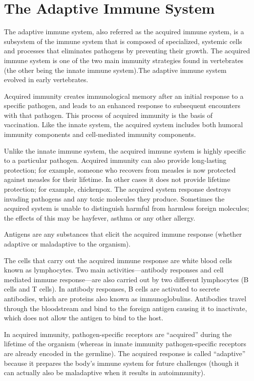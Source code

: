 \hypertarget{the-adaptive-immune-system}{%
\section{The Adaptive Immune System}\label{the-adaptive-immune-system}}

The adaptive immune system, also referred as the acquired immune system, is a subsystem of the immune system that is composed of specialized, systemic cells and processes that eliminates pathogens by preventing their growth. The acquired immune system is one of the two main immunity strategies found in vertebrates (the other being the innate immune system).The adaptive immune system evolved in early vertebrates.

Acquired immunity creates immunological memory after an initial response to a specific pathogen, and leads to an enhanced response to subsequent encounters with that pathogen. This process of acquired immunity is the basis of vaccination. Like the innate system, the acquired system includes both humoral immunity components and cell-mediated immunity components.

Unlike the innate immune system, the acquired immune system is highly specific to a particular pathogen. Acquired immunity can also provide long-lasting protection; for example, someone who recovers from measles is now protected against measles for their lifetime. In other cases it does not provide lifetime protection; for example, chickenpox. The acquired system response destroys invading pathogens and any toxic molecules they produce. Sometimes the acquired system is unable to distinguish harmful from harmless foreign molecules; the effects of this may be hayfever, asthma or any other allergy.

Antigens are any substances that elicit the acquired immune response (whether adaptive or maladaptive to the organism).

The cells that carry out the acquired immune response are white blood cells known as lymphocytes. Two main activities---antibody responses and cell mediated immune response---are also carried out by two different lymphocytes (B cells and T cells). In antibody responses, B cells are activated to secrete antibodies, which are proteins also known as immunoglobulins. Antibodies travel through the bloodstream and bind to the foreign antigen causing it to inactivate, which does not allow the antigen to bind to the host.

In acquired immunity, pathogen-specific receptors are ``acquired'' during the lifetime of the organism (whereas in innate immunity pathogen-specific receptors are already encoded in the germline). The acquired response is called ``adaptive'' because it prepares the body's immune system for future challenges (though it can actually also be maladaptive when it results in autoimmunity).


